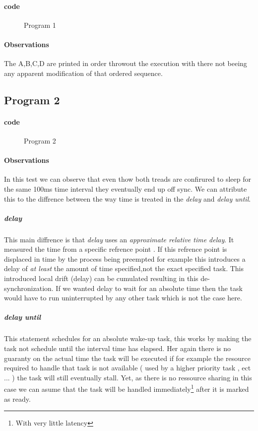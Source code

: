\documentclass[10pt,a4paper]{article}
\begin{document}
\paragraph{code}
\begin{figure}[H]
\begin{center}

\caption{Program 1}
\end{center}

\end{figure}

\paragraph{Observations}
The A,B,C,D are printed in order throwout the execution with there not beeing any apparent modification of that ordered sequence.
\subsection{Program 2}
\paragraph{code}
\begin{figure}[H]
\begin{center}

\caption{Program 2}
\end{center}
\end{figure}

\paragraph{Observations}
In this test we can observe that even thow both treads are confirured to sleep for the same 100ms time interval they eventually end up off sync. We can attribute this to the diffrence between the way time is treated in the \emph{delay} and \emph{delay until}.
\\
\subparagraph{delay}
This main diffrence is that \emph{delay} uses an \textit{approximate relative time delay}. It measured the time from a specific refrence point . If this refrence point is displaced in time by the process being preempted for example this  introduces a delay of \emph{at least} the amount of time specified,not the exact specified task. This introduced local drift (delay) can be cumulated resulting in this de-synchronization.
If we wanted delay to wait for an absolute time then the task would have to run uninterrupted by any other task which is not the case here.
\subparagraph{delay until}
This statement schedules for an absolute wake-up task, this works by making the task not schedule until the interval time has elapsed. Her again there is no guaranty on the actual time the task will be executed if for example the resource required to handle that task is not available ( used by a higher priority task , ect ... ) the task will still eventually stall. Yet, as there is no ressource sharing in this case we can asume that the task will be handled immediately\footnote{With very little latency} after it is marked as ready.
\end{document}
